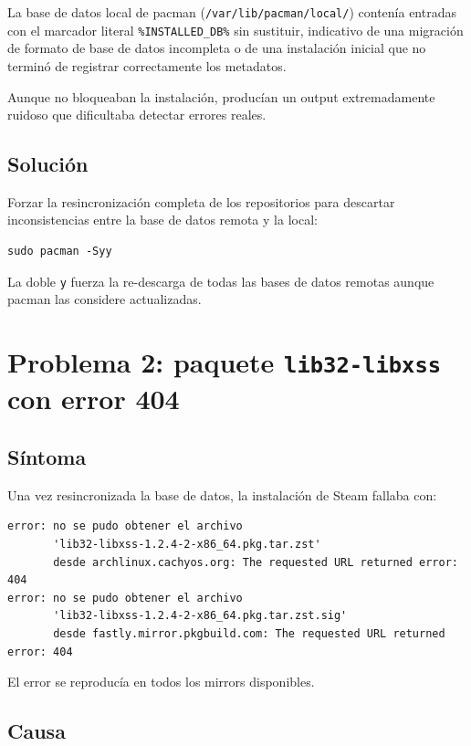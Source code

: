 \documentclass[12pt,a4paper]{article}
\begin{document}
La base de datos local de pacman (\texttt{/var/lib/pacman/local/}) contenía
entradas con el marcador literal \texttt{\%INSTALLED\_DB\%} sin sustituir,
indicativo de una migración de formato de base de datos incompleta o de una
instalación inicial que no terminó de registrar correctamente los metadatos.

Aunque no bloqueaban la instalación, producían un output extremadamente ruidoso
que dificultaba detectar errores reales.

\subsection{Solución}

Forzar la resincronización completa de los repositorios para descartar
inconsistencias entre la base de datos remota y la local:

\begin{lstlisting}[style=bash]
sudo pacman -Syy
\end{lstlisting}

La doble \texttt{y} fuerza la re-descarga de todas las bases de datos remotas
aunque pacman las considere actualizadas.

\section{Problema 2: paquete \texttt{lib32-libxss} con error 404}

\subsection{Síntoma}

Una vez resincronizada la base de datos, la instalación de Steam fallaba con:

\begin{lstlisting}[style=bash]
error: no se pudo obtener el archivo
       'lib32-libxss-1.2.4-2-x86_64.pkg.tar.zst'
       desde archlinux.cachyos.org: The requested URL returned error: 404
error: no se pudo obtener el archivo
       'lib32-libxss-1.2.4-2-x86_64.pkg.tar.zst.sig'
       desde fastly.mirror.pkgbuild.com: The requested URL returned error: 404
\end{lstlisting}

El error se reproducía en todos los mirrors disponibles.

\subsection{Causa}
\end{document}
